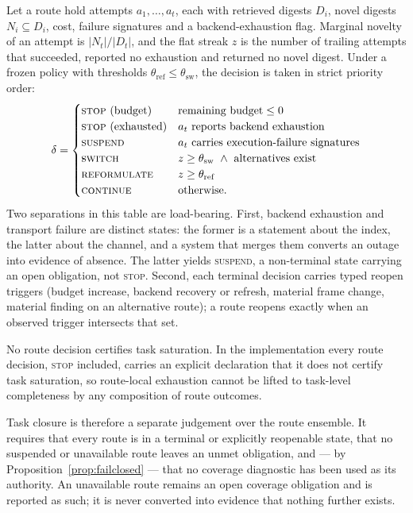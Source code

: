 Let a route hold attempts $a_1,\dots,a_t$, each with retrieved digests
$D_i$, novel digests $N_i \subseteq D_i$, cost, failure signatures and a
backend-exhaustion flag. Marginal novelty of an attempt is $|N_t|/|D_t|$, and
the flat streak $z$ is the number of trailing attempts that succeeded, reported
no exhaustion and returned no novel digest. Under a frozen policy with
thresholds $\theta_{\mathrm{ref}} \leq \theta_{\mathrm{sw}}$, the decision is
taken in strict priority order:
\[
\delta =
\begin{cases}
\textsc{stop}\ (\text{budget}) & \text{remaining budget} \leq 0\\
\textsc{stop}\ (\text{exhausted}) & a_t\ \text{reports backend exhaustion}\\
\textsc{suspend} & a_t\ \text{carries execution-failure signatures}\\
\textsc{switch} & z \geq \theta_{\mathrm{sw}}\ \wedge\ \text{alternatives exist}\\
\textsc{reformulate} & z \geq \theta_{\mathrm{ref}}\\
\textsc{continue} & \text{otherwise.}
\end{cases}
\]
Two separations in this table are load-bearing. First, backend exhaustion and
transport failure are distinct states: the former is a statement about the
index, the latter about the channel, and a system that merges them converts an
outage into evidence of absence. The latter yields \textsc{suspend}, a
non-terminal state carrying an open obligation, not \textsc{stop}. Second, each
terminal decision carries typed reopen triggers (budget increase, backend
recovery or refresh, material frame change, material finding on an alternative
route); a route reopens exactly when an observed trigger intersects that set.

\begin{proposition}
\label{prop:failclosed}
No route decision certifies task saturation. In the implementation every route
decision, \textsc{stop} included, carries an explicit declaration that it does
not certify task saturation, so route-local exhaustion cannot be lifted to
task-level completeness by any composition of route outcomes.
\end{proposition}

Task closure is therefore a separate judgement over the route ensemble. It
requires that every route is in a terminal or explicitly reopenable state, that
no suspended or unavailable route leaves an unmet obligation, and --- by
Proposition~\ref{prop:failclosed} --- that no coverage diagnostic has been used
as its authority. An unavailable route remains an open coverage obligation and
is reported as such; it is never converted into evidence that nothing further
exists.

